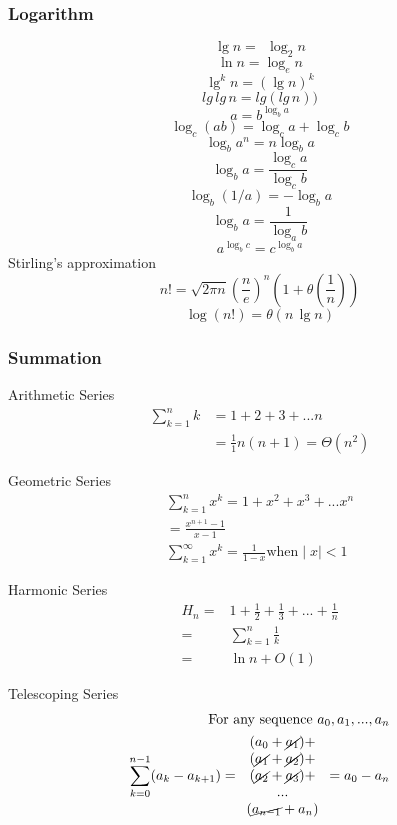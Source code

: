 \documentclass{article}
\begin{document}
\begin{multicols*}{4}
\subsubsection{Logarithm}
\[
\lg n = \
\
\log_2 n
\]
\[
\ln n = \log_e n
\]
\[
\lg^k n = (\lg n)^k
\]
\[
lg\, lg\, n = lg(lg\, n))
\]
\[
a = b^{\log_b a}
\]
\[
\log_c (ab) = \log_c a + \log_c b
\]
\[
\log_b a^n = n \log_ba
\]
\[
\log_b a = \frac{\log_c a}{\log_c b}
\]
\[
\log_b (1/a) = - \log_b a
\]
\[
\log_b a = \frac{1}{\log_a b}
\]
\[
a^{\log_b c} = c^{\log_b a}
\]
Stirling's approximation
\[
n! = \sqrt{2 \pi n} \left( \frac{n}{e} \right) ^n \left( 1+ \theta \left( \frac{1}{n} \right) \right)
\]
\[
\log(n!) = \theta (n\, \lg n)
\]

\subsubsection{Summation}
Arithmetic Series
\begin{align*}
\sum_{k=1}^{n}k&=1+2+3+...n\\
&=\frac{1}{1}n(n+1)=\Theta(n^2)
\end{align*}

\noindent Geometric Series
\begin{align*}
\sum_{k=1}^{n}x^k= 1 + x^2 + x^3 + ... x^n\\
=\frac{x^{n+1}-1}{x-1}\\
\sum_{k=1}^{\infty}x^k=\frac{1}{1-x} \text{when} \mid x \mid <1
\end{align*}

\noindent Harmonic Series
\begin{align*}
H_n =& 1 + \frac{1}{2} + \frac{1}{3} + ... + \frac{1}{n}\\
=&\sum_{k=1}^{n}\frac{1}{k}\\
=&\ln n + O(1)
\end{align*}


\noindent Telescoping Series
\begin{align*}
\text{For any sequence } a_0, a_1, ..., a_n\\
\sum_{k=0}^{n-1}(a_k-a_{k+1})=
\begin{array}{cl}
(a_0 + \cancel{a_1})+\\
(\cancel{a_1} + \cancel{a_2})+\\
(\cancel{a_2} + \cancel{a_3})+\\
...\\
(\cancel{a_{n-1}} + a_n)\\
\end{array}
=a_0 - a_n
\end{align*}


\end{multicols*}
\end{document}

